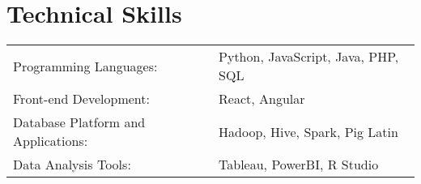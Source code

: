 \documentclass[a4paper,12pt]{article}
\begin{document}
\section{Technical Skills}
\begin{tabularx}{\linewidth}{@{}l X@{}}
Programming Languages: &  \normalsize{Python, JavaScript, Java, PHP, SQL}\\
Front-end Development: &  \normalsize{React, Angular}\\
Database Platform and Applications: &  \normalsize{Hadoop, Hive, Spark, Pig Latin}\\  
Data Analysis Tools: &  \normalsize{Tableau, PowerBI, R Studio}\\  
\end{tabularx}

\vfill
{}
\end{document}
